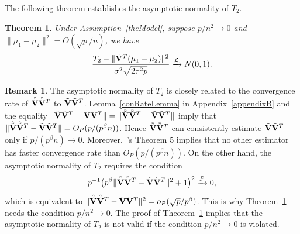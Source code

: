 \documentclass[review]{elsarticle}
\theoremstyle{plain}
\newtheorem{theorem}{\quad\quad Theorem}
\theoremstyle{definition}
\newtheorem{remark}{\quad\quad Remark}
\theoremstyle{remark}
\begin{document}
The following theorem establishes the asymptotic normality of $T_2$.
\begin{theorem}\label{myPanpan}
    Under Assumption~\ref{theModel},
suppose $p/n^2\to 0$ and
    $\|\mu_1-\mu_2\|^2=O({\sqrt{p}}/{n})$,
    we have
\begin{equation*}
        \frac{T_2-\|\tilde{\mathbf{V}}^T(\mu_1-\mu_2)\|^2}{\sigma^2\sqrt{2\tau^2 p}}\xrightarrow{\mathcal{L}}N(0,1).
\end{equation*}
\end{theorem} 
\begin{remark}
The asymptotic normality of $T_2$ is closely related to the convergence rate of $\hat{\tilde{\mathbf{V}}}\hat{\tilde{\mathbf{V}}}^T$ to $\tilde{\mathbf{V}}\tilde{\mathbf{V}}^T$.
    Lemma~\ref{conRateLemma} in Appendix~\ref{appendixB} and the equality $\|\hat{\mathbf{V}}\hat{\mathbf{V}}^T -\mathbf{V} \mathbf{V}^T\|=\|\hat{\tilde{\mathbf{V}}}\hat{\tilde{\mathbf{V}}}^T -\tilde{\mathbf{V}} \tilde{\mathbf{V}}^T\|$ imply that 
    $\|\hat{\tilde{\mathbf{V}}}\hat{\tilde{\mathbf{V}}}^T -\tilde{\mathbf{V}} \tilde{\mathbf{V}}^T\|=O_P(p/(p^{\beta}n))$.
    Hence $\hat{\tilde{\mathbf{V}}}\hat{\tilde{\mathbf{V}}}^T$ can consistently estimate $\tilde{\mathbf{V}}\tilde{\mathbf{V}}^T$ only if $p/(p^{\beta}n)\to 0$.
    Moreover,~\cite{Cai2012Sparse}'s Theorem $5$ implies that no other estimator has faster convergence rate than $O_P(p/(p^{\beta}n))$.
    On the other hand, the asymptotic normality of $T_2$ requires the condition
    $$
    p^{-1}\big(p^{\beta}\|\hat{\tilde{\mathbf{V}}}\hat{\tilde{\mathbf{V}}}^T -\tilde{\mathbf{V}} \tilde{\mathbf{V}}^T\|^2+1\big)^2\xrightarrow{P} 0,
    $$
    which is equivalent to $\|\hat{\tilde{\mathbf{V}}}\hat{\tilde{\mathbf{V}}}^T -\tilde{\mathbf{V}} \tilde{\mathbf{V}}^T\|^2=o_P(\sqrt{p}/p^{\beta})$.
    This is why Theorem~\ref{myPanpan} needs the condition  $p/n^2\to 0$.
The proof of Theorem~\ref{myPanpan} implies that the asymptotic normality of $T_2$ is not valid if the condition $p/n^2\to 0$ is violated.
\end{remark}
\end{document}
